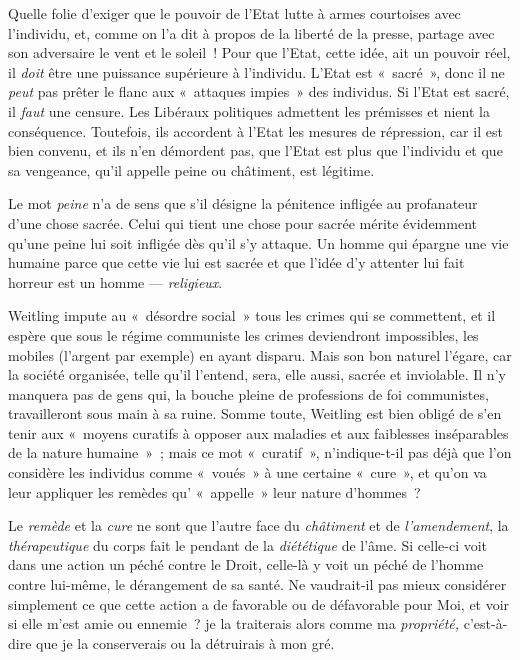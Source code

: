 \documentclass[french,twoside]{book} %
\begin{document}
Quelle folie d’exiger que le pouvoir de l’Etat lutte à armes courtoises avec l’individu, et, comme on l’a dit à propos de la liberté de la presse, partage avec son adversaire le vent et le soleil ! Pour que l’Etat, cette idée, ait un pouvoir réel, il \emph{doit} être une puissance supérieure à l’individu. L’Etat est « sacré », donc il ne \emph{peut} pas prêter le flanc aux « attaques impies » des individus. Si l’Etat est sacré, il \emph{faut }une censure. Les Libéraux politiques admettent les prémisses et nient la conséquence. Toutefois, ils accordent à l’Etat les mesures de répression, car il est bien convenu, et ils n’en démordent pas, que l’Etat est plus que l’individu et que sa vengeance, qu’il appelle peine ou châtiment, est légitime.\par
Le mot \emph{peine} n’a de sens que s’il désigne la pénitence infligée au profanateur d’une chose sacrée. Celui qui tient une chose pour sacrée mérite évidemment qu’une peine lui soit infligée dès qu’il s’y attaque. Un homme qui épargne une vie humaine parce que  cette vie lui est sacrée et que l’idée d’y attenter lui fait horreur est un homme — \emph{religieux}.\par
Weitling impute au « désordre social » tous les crimes qui se commettent, et il espère que sous le régime communiste les crimes deviendront impossibles, les mobiles (l’argent par exemple) en ayant disparu. Mais son bon naturel l’égare, car la société organisée, telle qu’il l’entend, sera, elle aussi, sacrée et inviolable. Il n’y manquera pas de gens qui, la bouche pleine de professions de foi communistes, travailleront sous main à sa ruine. Somme toute, Weitling est bien obligé de s’en tenir aux « moyens curatifs à opposer aux maladies et aux faiblesses inséparables de la nature humaine » ; mais ce mot « curatif », n’indique-t-il pas déjà que l’on considère les individus comme « voués » à une certaine « cure », et qu’on va leur appliquer les remèdes qu’ « appelle » leur nature d’hommes ?\par
Le \emph{remède} et la \emph{cure} ne sont que l’autre face du \emph{châtiment} et de \emph{l’amendement}, la \emph{thérapeutique} du corps fait le pendant de la \emph{diététique} de l’âme. Si celle-ci voit dans une action un péché contre le Droit, celle-là y voit un péché de l’homme contre lui-même, le dérangement de sa santé. Ne vaudrait-il pas mieux considérer simplement ce que cette action a de favorable ou de défavorable pour Moi, et voir si elle m’est amie ou ennemie ? je la traiterais alors comme ma \emph{propriété,} c’est-à-dire que je la conserverais ou la détruirais à mon gré.\par
\end{document}
